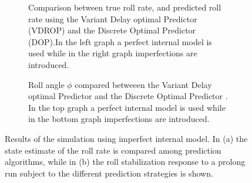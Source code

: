 \begin{figure}
    \centering
    \begin{subfigure}[b]{\textwidth}
        \caption{Comparison between true roll rate, and predicted roll rate using the Variant Delay optimal Predictor (VDROP) and the  Discrete Optimal Predictor (DOP).In the left graph a perfect internal model is used while in the right graph imperfections are introduced.}
        \label{fig:predictor_compare}
    \end{subfigure}
    \begin{subfigure}[b]{\textwidth}
        \centering
        \caption{Roll angle \ensuremath{\phi} compared betweeen  the Variant Delay optimal Predictor and the Discrete Optimal Predictor . In the top graph a perfect internal model is used while in the bottom graph imperfections are introduced.}            
        \label{fig:predictor_compare2}
    \end{subfigure}
    \caption{Results of the simulation using imperfect internal model. In (a) the state estimate of the roll rate is compared among prediction algorithms, while in (b) the roll stabilization response to a prolong run subject to  the different prediction strategies is shown.}
    \label{fig:predictor_compareA}
 \end{figure}


